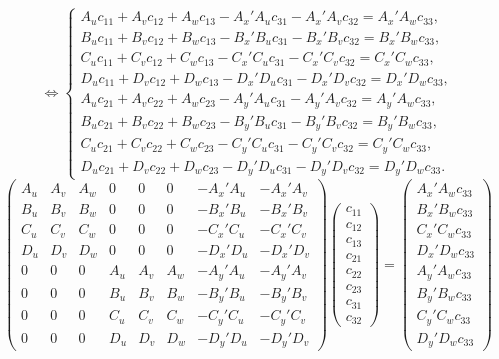 \begin{equation*}
	\Leftrightarrow
	\begin{cases}
		A_u c_{11} + A_v c_{12} + A_w c_{13} - A_x'A_u c_{31} - A_x'A_v c_{32} = A_x'A_w c_{33},\\
		B_u c_{11} + B_v c_{12} + B_w c_{13} - B_x'B_u c_{31} - B_x'B_v c_{32} = B_x'B_w c_{33},\\
		C_u c_{11} + C_v c_{12} + C_w c_{13} - C_x'C_u c_{31} - C_x'C_v c_{32} = C_x'C_w c_{33},\\
		D_u c_{11} + D_v c_{12} + D_w c_{13} - D_x'D_u c_{31} - D_x'D_v c_{32} = D_x'D_w c_{33},\\
		A_u c_{21} + A_v c_{22} + A_w c_{23} - A_y'A_u c_{31} - A_y'A_v c_{32} = A_y'A_w c_{33},\\
		B_u c_{21} + B_v c_{22} + B_w c_{23} - B_y'B_u c_{31} - B_y'B_v c_{32} = B_y'B_w c_{33},\\
		C_u c_{21} + C_v c_{22} + C_w c_{23} - C_y'C_u c_{31} - C_y'C_v c_{32} = C_y'C_w c_{33},\\
		D_u c_{21} + D_v c_{22} + D_w c_{23} - D_y'D_u c_{31} - D_y'D_v c_{32} = D_y'D_w c_{33}.
	\end{cases}
\end{equation*}
\begin{equation*}
	\begin{pmatrix}
		A_u & A_v & A_w & 0   & 0   & 0   & -A_x'A_u & -A_x'A_v \\
		B_u & B_v & B_w & 0   & 0   & 0   & -B_x'B_u & -B_x'B_v \\
		C_u & C_v & C_w & 0   & 0   & 0   & -C_x'C_u & -C_x'C_v \\
		D_u & D_v & D_w & 0   & 0   & 0   & -D_x'D_u & -D_x'D_v \\
		0   & 0   & 0   & A_u & A_v & A_w & -A_y'A_u & -A_y'A_v \\
		0   & 0   & 0   & B_u & B_v & B_w & -B_y'B_u & -B_y'B_v \\
		0   & 0   & 0   & C_u & C_v & C_w & -C_y'C_u & -C_y'C_v \\
		0   & 0   & 0   & D_u & D_v & D_w & -D_y'D_u & -D_y'D_v
	\end{pmatrix}
	\begin{pmatrix}
		c_{11}\\
		c_{12}\\
		c_{13}\\
		c_{21}\\
		c_{22}\\
		c_{23}\\
		c_{31}\\
		c_{32}
	\end{pmatrix}
	=
	\begin{pmatrix}
		A_x'A_w c_{33}\\
		B_x'B_w c_{33}\\
		C_x'C_w c_{33}\\
		D_x'D_w c_{33}\\
		A_y'A_w c_{33}\\
		B_y'B_w c_{33}\\
		C_y'C_w c_{33}\\
		D_y'D_w c_{33}
	\end{pmatrix}
\end{equation*}

